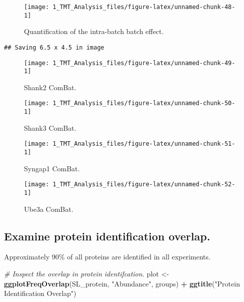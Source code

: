 \documentclass[]{article}
\newenvironment{Shaded}{\begin{snugshade}}{\end{snugshade}}
\newcommand{\KeywordTok}[1]{\textcolor[rgb]{0.13,0.29,0.53}{\textbf{#1}}}
\newcommand{\StringTok}[1]{\textcolor[rgb]{0.31,0.60,0.02}{#1}}
\newcommand{\CommentTok}[1]{\textcolor[rgb]{0.56,0.35,0.01}{\textit{#1}}}
\newcommand{\OperatorTok}[1]{\textcolor[rgb]{0.81,0.36,0.00}{\textbf{#1}}}
\newcommand{\NormalTok}[1]{#1}
\begin{document}
\begin{figure}

{\centering \texttt{[image: 1\_TMT\_Analysis\_files/figure-latex/unnamed-chunk-48-1]} 

}

\caption{Quantification of the intra-batch batch effect.}\label{fig:unnamed-chunk-48}
\end{figure}

\begin{verbatim}
## Saving 6.5 x 4.5 in image
\end{verbatim}

\begin{figure}

{\centering \texttt{[image: 1\_TMT\_Analysis\_files/figure-latex/unnamed-chunk-49-1]} 

}

\caption{Shank2 ComBat.}\label{fig:unnamed-chunk-49}
\end{figure}\begin{figure}

{\centering \texttt{[image: 1\_TMT\_Analysis\_files/figure-latex/unnamed-chunk-50-1]} 

}

\caption{Shank3 ComBat.}\label{fig:unnamed-chunk-50}
\end{figure}\begin{figure}

{\centering \texttt{[image: 1\_TMT\_Analysis\_files/figure-latex/unnamed-chunk-51-1]} 

}

\caption{Syngap1 ComBat.}\label{fig:unnamed-chunk-51}
\end{figure}\begin{figure}

{\centering \texttt{[image: 1\_TMT\_Analysis\_files/figure-latex/unnamed-chunk-52-1]} 

}

\caption{Ube3a ComBat.}\label{fig:unnamed-chunk-52}
\end{figure}

\subsection{Examine protein identification
overlap.}\label{examine-protein-identification-overlap.}

Approximately 90\% of all proteins are identified in all experiments.

\begin{Shaded}
\begin{Highlighting}[]
\CommentTok{# Inspect the overlap in protein identifcation.}
\NormalTok{plot <-}\StringTok{ }\KeywordTok{ggplotFreqOverlap}\NormalTok{(SL_protein, }\StringTok{"Abundance"}\NormalTok{, groups) }\OperatorTok{+}
\StringTok{  }\KeywordTok{ggtitle}\NormalTok{(}\StringTok{"Protein Identification Overlap"}\NormalTok{)}
\end{Highlighting}
\end{Shaded}
\end{document}
